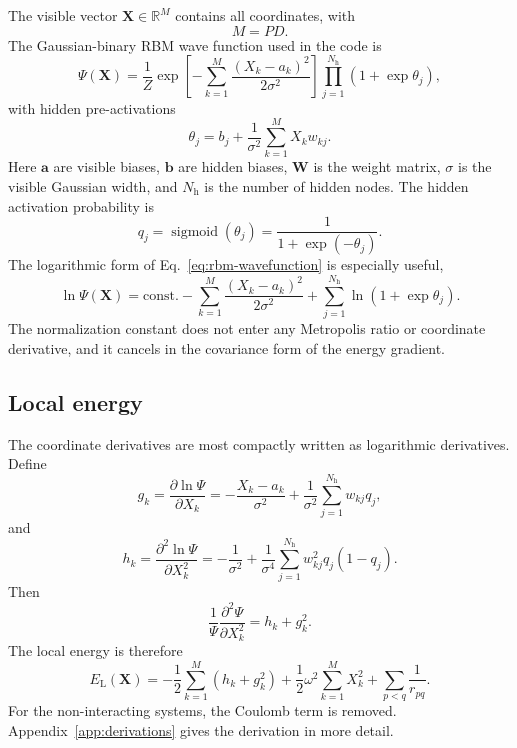 \documentclass[10pt,a4paper]{article}
\newcommand{\bX}{\mathbf{X}}
\newcommand{\ba}{\mathbf{a}}
\newcommand{\bb}{\mathbf{b}}
\newcommand{\bW}{\mathbf{W}}
\newcommand{\EL}{E_{\mathrm{L}}}
\newcommand{\Nh}{N_{\mathrm{h}}}
\newcommand{\sigmoid}{\operatorname{sigmoid}}
\begin{document}
The visible vector $\bX\in\mathbb{R}^{M}$ contains all coordinates, with
\begin{equation}
M=PD.
\end{equation}
The Gaussian-binary RBM wave function used in the code is
\begin{equation}
\Psi(\bX)
=
\frac{1}{Z}
\exp\left[-\sum_{k=1}^{M}\frac{(X_k-a_k)^2}{2\sigma^2}\right]
\prod_{j=1}^{\Nh}
\left(1+\exp \theta_j\right),
\label{eq:rbm-wavefunction}
\end{equation}
with hidden pre-activations
\begin{equation}
\theta_j=b_j+\frac{1}{\sigma^2}\sum_{k=1}^{M}X_k w_{kj}.
\end{equation}
Here $\ba$ are visible biases, $\bb$ are hidden biases, $\bW$ is the weight matrix, $\sigma$ is the visible Gaussian width, and $\Nh$ is the number of hidden nodes. The hidden activation probability is
\begin{equation}
q_j=\sigmoid(\theta_j)=\frac{1}{1+\exp(-\theta_j)}.
\end{equation}
The logarithmic form of Eq.~\eqref{eq:rbm-wavefunction} is especially useful,
\begin{equation}
\ln\Psi(\bX)=\mathrm{const.}
-\sum_{k=1}^{M}\frac{(X_k-a_k)^2}{2\sigma^2}
+
\sum_{j=1}^{\Nh}\ln(1+\exp\theta_j).
\label{eq:logpsi}
\end{equation}
The normalization constant does not enter any Metropolis ratio or coordinate derivative, and it cancels in the covariance form of the energy gradient.

\subsection{Local energy}

The coordinate derivatives are most compactly written as logarithmic derivatives. Define
\begin{equation}
g_k=\frac{\partial \ln \Psi}{\partial X_k}
= -\frac{X_k-a_k}{\sigma^2}
+\frac{1}{\sigma^2}\sum_{j=1}^{\Nh}w_{kj}q_j,
\label{eq:gk}
\end{equation}
and
\begin{equation}
h_k=\frac{\partial^2 \ln \Psi}{\partial X_k^2}
= -\frac{1}{\sigma^2}
+\frac{1}{\sigma^4}\sum_{j=1}^{\Nh}w_{kj}^2q_j(1-q_j).
\label{eq:hk}
\end{equation}
Then
\begin{equation}
\frac{1}{\Psi}\frac{\partial^2\Psi}{\partial X_k^2}=h_k+g_k^2.
\end{equation}
The local energy is therefore
\begin{equation}
\EL(\bX)
=
-\frac{1}{2}\sum_{k=1}^{M}\left(h_k+g_k^2\right)
+
\frac{1}{2}\omega^2\sum_{k=1}^{M}X_k^2
+
\sum_{p<q}\frac{1}{r_{pq}}.
\label{eq:local-energy-rbm}
\end{equation}
For the non-interacting systems, the Coulomb term is removed. Appendix~\ref{app:derivations} gives the derivation in more detail.
\end{document}

